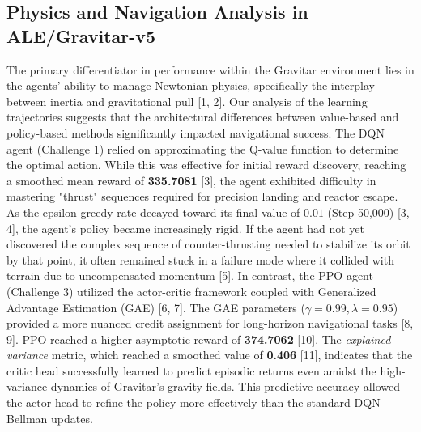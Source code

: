 \documentclass[conference]{IEEEtran}
\begin{document}

\subsection{Physics and Navigation Analysis in ALE/Gravitar-v5}
The primary differentiator in performance within the Gravitar environment lies in the agents' ability to manage Newtonian physics, specifically the interplay between inertia and gravitational pull [1, 2].
Our analysis of the learning trajectories suggests that the architectural differences between value-based and policy-based methods significantly impacted navigational success.
The DQN agent (Challenge 1) relied on approximating the Q-value function to determine the optimal action.
While this was effective for initial reward discovery, reaching a smoothed mean reward of \textbf{335.7081} [3], the agent exhibited difficulty in mastering "thrust" sequences required for precision landing and reactor escape.
As the epsilon-greedy rate decayed toward its final value of $0.01$ (Step 50,000) [3, 4], the agent’s policy became increasingly rigid.
If the agent had not yet discovered the complex sequence of counter-thrusting needed to stabilize its orbit by that point, it often remained stuck in a failure mode where it collided with terrain due to uncompensated momentum [5].
In contrast, the PPO agent (Challenge 3) utilized the actor-critic framework coupled with Generalized Advantage Estimation (GAE) [6, 7].
The GAE parameters ($\gamma=0.99, \lambda=0.95$) provided a more nuanced credit assignment for long-horizon navigational tasks [8, 9].
PPO reached a higher asymptotic reward of \textbf{374.7062} [10]. The \textit{explained variance} metric, which reached a smoothed value of \textbf{0.406} [11], indicates that the critic head successfully learned to predict episodic returns even amidst the high-variance dynamics of Gravitar's gravity fields.
This predictive accuracy allowed the actor head to refine the policy more effectively than the standard DQN Bellman updates.
\end{document}
